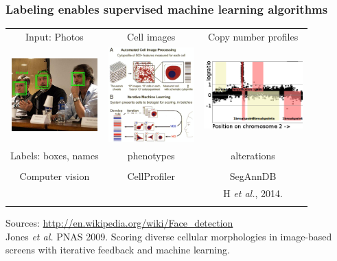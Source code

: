 \documentclass{beamer}
\begin{document}
\begin{frame}
  \frametitle{Labeling enables supervised machine learning algorithms}
  \begin{tabular}{ccc}
    Input: Photos & Cell images & Copy number profiles \\
    \includegraphics[width=1.3in]{faces} &
    \includegraphics[width=1.3in]{cellprofiler} &
    \includegraphics[width=1.5in]{regions-axes}\\
    Labels: boxes, names & phenotypes & alterations \\ \\
Computer vision
 & CellProfiler & SegAnnDB \\
 & 
 & H {\it et al.}, 2014. \\
     &
  \end{tabular}
  Sources: \url{http://en.wikipedia.org/wiki/Face_detection}\\
  Jones {\it et al.} PNAS 2009. Scoring diverse cellular morphologies in
  image-based screens with iterative feedback and machine learning.
\end{frame}
\end{document}
